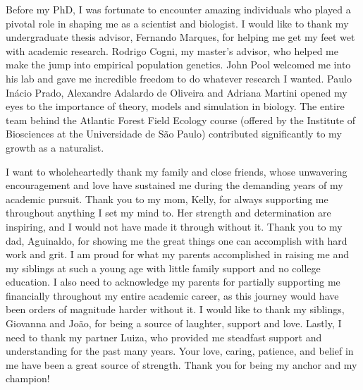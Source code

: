{Before my PhD, I was fortunate to encounter amazing individuals who played a pivotal role in shaping me as a scientist and biologist.
I would like to thank my undergraduate thesis advisor, Fernando Marques, for helping me get my feet wet with academic research.
Rodrigo Cogni, my master's advisor, who helped me make the jump into empirical population genetics.
John Pool welcomed me into his lab and gave me incredible freedom to do whatever research I wanted.
Paulo Inácio Prado, Alexandre Adalardo de Oliveira and Adriana Martini opened my eyes to the importance of theory, models and simulation in biology.
The entire team behind the Atlantic Forest Field Ecology course (offered by the Institute of Biosciences at the Universidade de São Paulo) contributed significantly to my growth as a naturalist.

I want to wholeheartedly thank my family and close friends,
whose unwavering encouragement and love have sustained me during the demanding years of my academic pursuit.
Thank you to my mom, Kelly, for always supporting me throughout anything I set my mind to.
Her strength and determination are inspiring, and I would not have made it through without it.
Thank you to my dad, Aguinaldo, for showing me the great things one can accomplish with hard work and grit.
I am proud for what my parents accomplished in raising me and my siblings
at such a young age with little family support and no college education.
I also need to acknowledge my parents for partially supporting me financially throughout my entire academic career,
as this journey would have been orders of magnitude harder without it.
I would like to thank my siblings, Giovanna and João, for being a source of laughter, support and love.
Lastly, I need to thank my partner Luiza, who provided me steadfast support and understanding for the past many years.
Your love, caring, patience, and belief in me have been a great source of strength.
Thank you for being my anchor and my champion!

}

